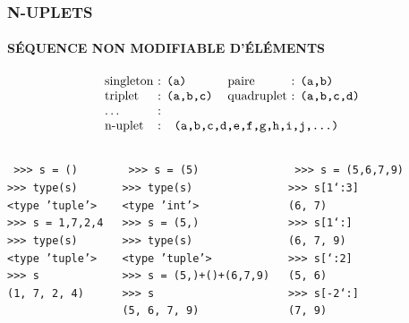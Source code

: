 \begin{frame}
\frametitle{\uppercase{n-uplets}}
\framesubtitle{\uppercase{séquence non modifiable d'éléments}}
	$$\begin{tabular}{l@{ : }ll@{ : }l}
	singleton & {\tt (a)}     & paire      & {\tt (a,b)} \\%
	triplet   & {\tt (a,b,c)} & quadruplet & {\tt (a,b,c,d)} \\%
	\ldots    & \\
	n-uplet   & \multicolumn{3}{l}{\tt (a,b,c,d,e,f,g,h,i,j,\ldots)}
	\end{tabular}$$

\vspace*{1cm}

\begin{columns}[T]

\column{3.25cm}
\begin{py}{3.25cm}\tt
>{>}> s = ()\\%
>{>}> type(s)\\
<type 'tuple'>\\%
>{>}> s = 1,7,2,4\\%
>{>}> type(s)\\
<type 'tuple'>\\%
>{>}> s\\
(1, 7, 2, 4)%
\end{py}
\column{3.25cm}
\begin{py}{3.25cm}\tt
>{>}> s = (5)\\
>{>}> type(s)\\
<type 'int'>\\%
>{>}> s = (5,)\\
>{>}> type(s)\\
<type 'tuple'>\\%
>{>}> s = (5,)+()+(6,7,9)\\
>{>}> s\\
(5, 6, 7, 9)%
\end{py}
\column{3.25cm}
\begin{py}{3.25cm}\tt
>{>}> s = (5,6,7,9)\\%
>{>}> s[1\char`:3]\\
(6, 7)\\%
>{>}> s[1\char`:]\\
(6, 7, 9)\\%
>{>}> s[\char`:2]\\
(5, 6)\\%
>{>}> s[-2\char`:]\\
(7, 9)
\end{py}
\end{columns}

\end{frame}



